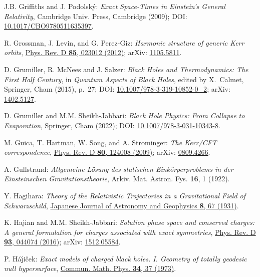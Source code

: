 \begin{thebibliography}{123}
J.B. Griffiths and J. Podolský:
{\em Exact Space-Times in Einstein's General Relativity},
Cambridge Univ. Press, Cambridge (2009);
DOI: \href{https://doi.org/10.1017/CBO9780511635397}{10.1017/CBO9780511635397}.

R. Grossman, J. Levin, and G. Perez-Giz:
{\em Harmonic structure of generic Kerr orbits},
\href{https://doi.org/10.1103/PhysRevD.85.023012}{Phys. Rev. D {\bf 85}, 023012 (2012)};
arXiv: \href{https://arxiv.org/abs/1105.5811}{1105.5811}.

D. Grumiller, R. McNees and J. Salzer:
{\em Black Holes and Thermodynamics: The First Half Century},
in {\em Quantum Aspects of Black Holes}, edited by X.~Calmet,
Springer, Cham (2015), p.~27;
DOI: \href{https://doi.org/10.1007/978-3-319-10852-0_2}{10.1007/978-3-319-10852-0\_2};
arXiv: \href{https://arxiv.org/abs/1402.5127}{1402.5127}.

D. Grumiller and M.M. Sheikh-Jabbari:
{\em Black Hole Physics: From Collapse to Evaporation},
Springer, Cham (2022);
DOI: \href{https://doi.org/10.1007/978-3-031-10343-8}{10.1007/978-3-031-10343-8}.

M. Guica, T. Hartman, W. Song, and A. Strominger:
{\em The Kerr/CFT correspondence},
\href{https://doi.org/10.1103/PhysRevD.80.124008}{Phys. Rev. D {\bf 80}, 124008 (2009)};
arXiv: \href{https://arxiv.org/abs/0809.4266}{0809.4266}.

A. Gullstrand:
\emph{Allgemeine Lösung des statischen Einkörperproblems in der Einsteinschen Gravitationstheorie},
Arkiv. Mat. Astron. Fys. {\bf 16}, 1 (1922).

Y. Hagihara:
\emph{Theory of the Relativistic Trajectories in a Gravitational Field of Schwarzschild},
\href{https://ui.adsabs.harvard.edu/abs/1930JaJAG...8...67H}{Japanese Journal of Astronomy and Geophysics {\bf 8}, 67 (1931)}.

K. Hajian and M.M. Sheikh-Jabbari:
{\em Solution phase space and conserved charges: A general formulation for charges associated with exact symmetries},
\href{https://doi.org/10.1103/PhysRevD.93.044074}{Phys. Rev. D {\bf 93}, 044074 (2016)};
arXiv: \href{https://arxiv.org/abs/1512.05584}{1512.05584}.

P. H\'a\'\j i\v{c}ek:
{\em Exact models of charged black holes. I. Geometry
of totally geodesic null hypersurface},
\href{https://doi.org/10.1007/BF01646541}{Commun. Math. Phys. {\bf 34}, 37 (1973)}.


\end{thebibliography}
